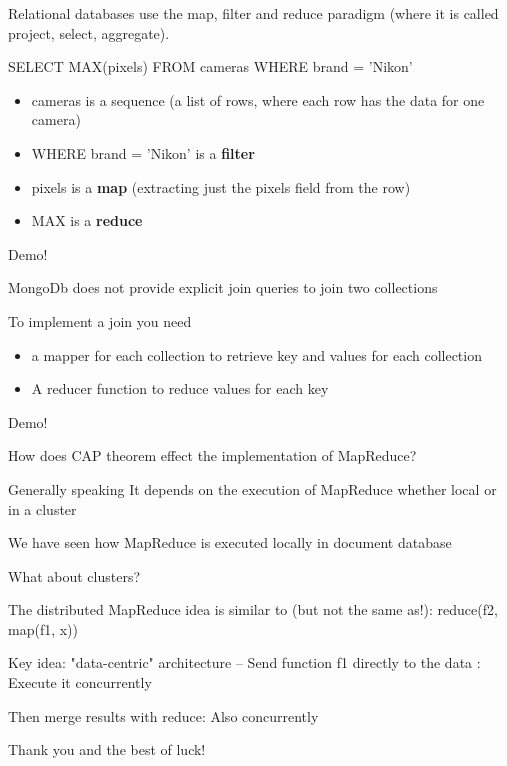 \documentclass{beamer}
\begin{document}
\begin{slide}{
\item Relational databases use the map, filter and reduce paradigm (where it is called project, select, aggregate).
\item SELECT MAX(pixels) FROM  cameras WHERE brand = 'Nikon' 
\begin{itemize}
\item cameras is a sequence (a list of rows, where each row has the data for one camera)
\item WHERE brand = 'Nikon'  is a \textbf{filter}
\item pixels is a \textbf{map} (extracting just the pixels field from the row)
\item MAX is a \textbf{reduce}
\end{itemize}
\item Demo!
}\end{slide}

\begin{slide}{
\item MongoDb does not provide explicit join queries to join two collections
\item To implement a join you need 
\begin{itemize}
\item  a mapper for each collection to retrieve key and values for each collection 
\item A reducer function to reduce values for each key
\end{itemize}
\item Demo! 
}\end{slide}

\begin{slide}{
\item How does CAP theorem effect the implementation of MapReduce?
\item Generally speaking It depends on the execution of MapReduce whether local or in a cluster 
\item We have seen how MapReduce is executed locally in document database 
\item What about clusters?
}\end{slide}

\begin{slide}{
\item The distributed MapReduce idea is similar to (but not the same as!): reduce(f2, map(f1, x))
\item Key idea: "data-centric" architecture –  Send function f1 directly to the data : Execute it concurrently
\item Then merge results with reduce: Also concurrently
}\end{slide}

\begin{slide}{
\item Thank you and the best of luck!
}\end{slide}
\end{document}
